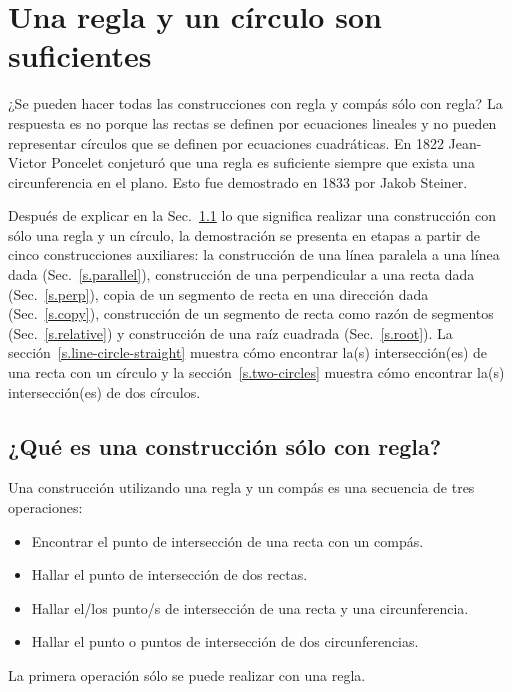 
\chapter{Una regla y un círculo son suficientes}\label{c.straightedge}


¿Se pueden hacer todas las construcciones con regla y compás sólo con regla? La respuesta es no porque las rectas se definen por ecuaciones lineales y no pueden representar círculos que se definen por ecuaciones cuadráticas. En 1822 Jean-Victor Poncelet conjeturó que una regla es suficiente siempre que exista una circunferencia en el plano. Esto fue demostrado en 1833 por Jakob Steiner.

Después de explicar en la Sec.~\ref{s.se-what} lo que significa realizar una construcción con sólo una regla y un círculo, la demostración se presenta en etapas a partir de cinco construcciones auxiliares: la construcción de una línea paralela a una línea dada (Sec.~\ref{s.parallel}), construcción de una perpendicular a una recta dada (Sec.~\ref{s.perp}), copia de un segmento de recta en una dirección dada (Sec.~\ref{s.copy}), construcción de un segmento de recta como razón de segmentos (Sec.~\ref{s.relative}) y construcción de una raíz cuadrada (Sec.~\ref{s.root}). La sección~\ref{s.line-circle-straight} muestra cómo encontrar la(s) intersección(es) de una recta con un círculo y la sección~\ref{s.two-circles} muestra cómo encontrar la(s) intersección(es) de dos círculos.

\section{¿Qué es una construcción sólo con regla?}\label{s.se-what}

Una construcción utilizando una regla y un compás es una secuencia de tres operaciones:
\begin{itemize}
\item Encontrar el punto de intersección de una recta con un compás.
\item Hallar el punto de intersección de dos rectas.
\item Hallar el/los punto/s de intersección de una recta y una circunferencia.
\item Hallar el punto o puntos de intersección de dos circunferencias.
\end{itemize}
La primera operación sólo se puede realizar con una regla.

